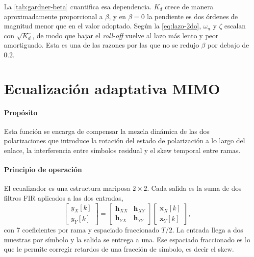 \begin{itemize}
La \cref{tab:gardner-beta} cuantifica esa dependencia. $K_d$ crece de manera
aproximadamente proporcional a $\beta$, y en $\beta = 0$ la pendiente es dos
\'ordenes de magnitud menor que en el valor adoptado. Seg\'un la
\cref{eq:lazo-2do}, $\omega_n$ y $\zeta$ escalan con $\sqrt{K_d}$, de modo que
bajar el \emph{roll-off} vuelve al lazo m\'as lento y peor amortiguado. Esta
es una de las razones por las que no se redujo $\beta$ por debajo de
\num{0.2}.

\end{itemize}


\section{Ecualizaci\'on adaptativa MIMO}
\label{sec:dsp-ddlms}

\paragraph{Prop\'osito}
Esta funci\'on se encarga de compensar la mezcla din\'amica de las dos
polarizaciones que introduce la rotaci\'on del estado de polarizaci\'on a lo
largo del enlace, la interferencia entre s\'imbolos residual y el skew
temporal entre ramas.

\paragraph{Principio de operaci\'on}
El ecualizador es una estructura mariposa $2\times2$. Cada salida es la suma
de dos filtros FIR aplicados a las dos entradas,
\begin{equation}
  \begin{bmatrix} y_X[k] \\ y_Y[k] \end{bmatrix}
  =
  \begin{bmatrix} \mathbf{h}_{XX} & \mathbf{h}_{XY} \\
                  \mathbf{h}_{YX} & \mathbf{h}_{YY} \end{bmatrix}
  \begin{bmatrix} \mathbf{x}_X[k] \\ \mathbf{x}_Y[k] \end{bmatrix},
  \label{eq:mariposa}
\end{equation}
con \num{7} coeficientes por rama y espaciado fraccionado $T/2$. La entrada
llega a dos muestras por s\'imbolo y la salida se entrega a una. Ese espaciado
fraccionado es lo que le permite corregir retardos de una fracci\'on de
s\'imbolo, es decir el skew.

